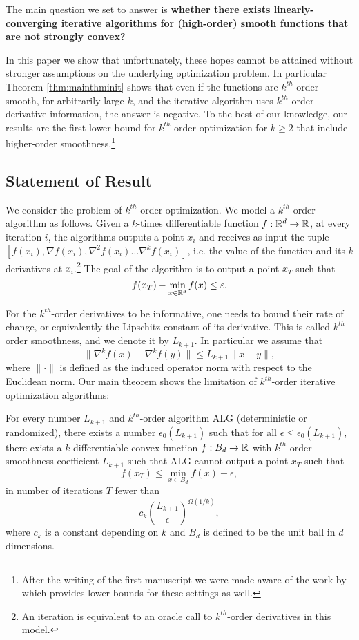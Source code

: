 \documentclass[final,12pt]{colt2018} %
\def\alg{\mathrm{ALG}}
\begin{document}
The main question we set to answer is {\bf whether there exists linearly-converging iterative algorithms for (high-order) smooth functions that are not strongly convex?}

In this paper we show that unfortunately, these hopes cannot be attained without stronger assumptions on the underlying optimization problem. In particular Theorem \ref{thm:mainthminit} shows that even if the functions are $k^{th}$-order smooth, for arbitrarily large $k$, and the iterative algorithm uses $k^{th}$-order derivative information, the answer is negative. To the best of our knowledge, our results are the first lower bound for $k^{th}$-order optimization for $k \geq 2$ that include higher-order smoothness.\footnote{After the writing of the first manuscript we were made aware of the work by \cite{shamir2017oracle} which provides lower bounds for these settings as well.}

\subsection{Statement of Result}

We consider the problem of $k^{th}$-order optimization. We model a $k^{th}$-order algorithm as follows. Given a $k$-times differentiable function $f: {\mathbb R}^d \rightarrow {\mathbb R}$, at every iteration $i$, the algorithms outputs a point $x_i$ and receives as input the tuple $[ f(x_i), \nabla f(x_i), \nabla^2 f(x_i) \ldots \nabla^k f(x_i)]$, i.e. the value of the function and its $k$ derivatives at $x_i$.\footnote{An iteration is equivalent to an oracle call to $k^{th}$-order derivatives in this model.} The goal of the algorithm is to output a point $x_T$ such that 
\[ f(x_T) - \min_{x \in {\mathbb R}^d} f(x) \leq \varepsilon. \]

For the $k^{th}$-order derivatives to be informative, one needs to bound their rate of change, or equivalently the Lipschitz constant of its derivative. This is called $k^{th}$-order smoothness, and we denote it by $L_{k+1}$. In particular we assume that
$$ \| \nabla^k f(x) - \nabla^k f(y) \| \leq L_{k+1} \| x-y \|,$$
where $\|\cdot\|$ is defined as the induced operator norm with respect to the Euclidean norm. Our main theorem shows the limitation of $k^{th}$-order iterative optimization algorithms: 

\begin{theorem}
\label{thm:mainthminit}
For every number $L_{k+1}$ and $k^{th}$-order algorithm $\alg$ (deterministic or randomized), there exists a number $\epsilon_0(L_{k+1})$ such that for all $\epsilon \leq \epsilon_0(L_{k+1})$, there exists a $k$-differentiable convex function $f:B_d \rightarrow {\mathbb R}$ with $k^{th}$-order smoothness coefficient $L_{k+1}$ such that $\alg$ cannot output a point $x_T$ such that
\[f(x_T) \leq \min_{x \in B_d} f(x) + \epsilon,\]
 in number of iterations $T$ fewer than
\[ c_k\left(\frac{L_{k+1}}{\epsilon}\right)^{\Omega(1/k) },\]
where $c_k$ is a constant depending on $k$ and $B_d$ is defined to be the unit ball in $d$ dimensions.
\end{theorem}
\end{document}
